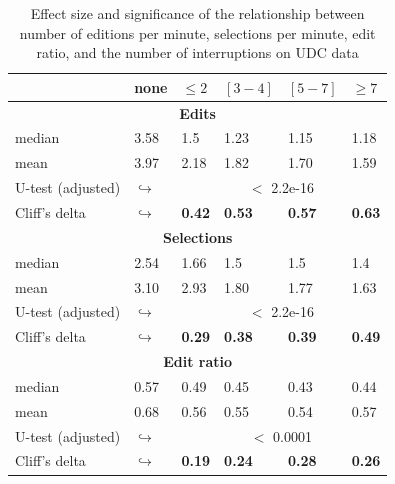 \documentclass[times]{smrauth}
\begin{document}
\begin{table}[ht!]
	\tiny
	\renewcommand{\arraystretch}{1.3}
	\caption{Effect size and significance of the relationship between number of editions per minute, selections per minute, edit ratio, and the number of interruptions on UDC data} 
	\label{tbl:p_value_udc}
	\centering
	\begin{tabular}{l | p{0.75cm} | p{1.2cm} | p{1.2cm} | p{1.2cm} |p{1.2cm}} 
		
		& none & $\leq 2$ & $[3 - 4]$ & $[5 - 7]$ & $\geq 7$  \\  
		\hline
		\multicolumn{6}{c}{\textbf{Edits}} \\
		\hline
		median & 3.58 & 1.5 & 1.23 & 1.15 & 1.18 \\
		\cline{2-6} 
		mean & 3.97 &	2.18 & 1.82 & 1.70 & 1.59 \\ 
		\cline{3-6} 
		U-test (adjusted) & $\hookrightarrow$ & \multicolumn{4}{c}{$<$ 2.2e-16} \\
		\cline{3-6} 
		Cliff's delta & $\hookrightarrow$	& \textbf{0.42} & \textbf{0.53} & \textbf{0.57} & \textbf{0.63}    \\
		
		
		\hline
		\multicolumn{6}{c}{\textbf{Selections}} \\
		\hline 
		median & 2.54 & 1.66 & 1.5 & 1.5 & 1.4 \\
		\cline{2-6} 
		mean & 3.10 &	2.93 & 1.80 & 1.77 & 1.63  \\ 
		\cline{3-6} 
		U-test (adjusted)& $\hookrightarrow$ & \multicolumn{4}{c}{$<$ 2.2e-16} \\
		\cline{3-6} 
		Cliff's delta & $\hookrightarrow$	& \textbf{0.29} & \textbf{0.38} & \textbf{0.39} & \textbf{0.49} \\  
		\hline
		
		\multicolumn{6}{c}{\textbf{Edit ratio}} \\
		\hline 
		median & 0.57 & 0.49 & 0.45 & 0.43 & 0.44 \\
		\cline{2-6} 
		mean & 0.68 & 0.56 & 0.55 & 0.54 & 0.57 \\ 
		\cline{3-6} 
		\cline{3-6} 
		U-test (adjusted) &  $\hookrightarrow$& \multicolumn{4}{c}{$<$ 0.0001} \\
		\cline{3-6} 
		Cliff's delta & $\hookrightarrow$ & \textbf{0.19} & \textbf{0.24} & \textbf{0.28} & \textbf{0.26} \\ 
		\hline
		
		
	\end{tabular}
\end{table}
\end{document}
